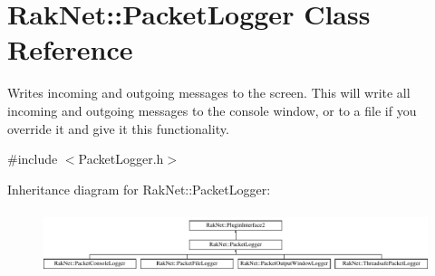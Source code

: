 \hypertarget{class_rak_net_1_1_packet_logger}{\section{Rak\-Net\-:\-:Packet\-Logger Class Reference}
\label{class_rak_net_1_1_packet_logger}
}


Writes incoming and outgoing messages to the screen. This will write all incoming and outgoing messages to the console window, or to a file if you override it and give it this functionality.  




{\ttfamily \#include $<$Packet\-Logger.\-h$>$}

Inheritance diagram for Rak\-Net\-:\-:Packet\-Logger\-:\begin{figure}[H]
\begin{center}
\leavevmode
\includegraphics[height=1.866667cm]{class_rak_net_1_1_packet_logger}
\end{center}
\end{figure}
